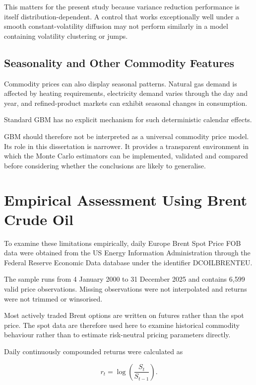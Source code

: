 \documentclass[12pt,a4paper]{report}
\begin{document}
This matters for the present study because variance reduction performance is itself distribution-dependent. A control that works exceptionally well under a smooth constant-volatility diffusion may not perform similarly in a model containing volatility clustering or jumps.

\subsection{Seasonality and Other Commodity Features}

Commodity prices can also display seasonal patterns. Natural gas demand is affected by heating requirements, electricity demand varies through the day and year, and refined-product markets can exhibit seasonal changes in consumption.

Standard GBM has no explicit mechanism for such deterministic calendar effects.

GBM should therefore not be interpreted as a universal commodity price model. Its role in this dissertation is narrower. It provides a transparent environment in which the Monte Carlo estimators can be implemented, validated and compared before considering whether the conclusions are likely to generalise.

\section{Empirical Assessment Using Brent Crude Oil}

To examine these limitations empirically, daily Europe Brent Spot Price FOB data were obtained from the US Energy Information Administration through the Federal Reserve Economic Data database under the identifier DCOILBRENTEU.

The sample runs from 4 January 2000 to 31 December 2025 and contains 6,599 valid price observations. Missing observations were not interpolated and returns were not trimmed or winsorised.

Most actively traded Brent options are written on futures rather than the spot price. The spot data are therefore used here to examine historical commodity behaviour rather than to estimate risk-neutral pricing parameters directly.

Daily continuously compounded returns were calculated as

\begin{equation}
r_t
=
\log
\left(
\frac{S_t}{S_{t-1}}
\right).
\end{equation}
\end{document}
